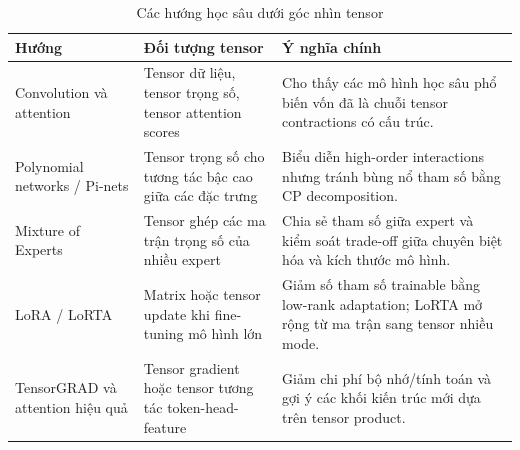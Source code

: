 \begin{table}[H]
\centering
\small
\caption{Các hướng học sâu dưới góc nhìn tensor}
\label{tab:dl-tensor-directions}
\begin{tabular}{L{0.23\textwidth}L{0.34\textwidth}L{0.34\textwidth}}
\toprule
\textbf{Hướng} & \textbf{Đối tượng tensor} & \textbf{Ý nghĩa chính} \\
\midrule
Convolution và attention &
Tensor dữ liệu, tensor trọng số, tensor attention scores &
Cho thấy các mô hình học sâu phổ biến vốn đã là chuỗi tensor contractions có cấu trúc. \\
	\addlinespace
Polynomial networks / Pi-nets &
Tensor trọng số cho tương tác bậc cao giữa các đặc trưng &
Biểu diễn high-order interactions nhưng tránh bùng nổ tham số bằng CP decomposition. \\
	\addlinespace
Mixture of Experts &
Tensor ghép các ma trận trọng số của nhiều expert &
Chia sẻ tham số giữa expert và kiểm soát trade-off giữa chuyên biệt hóa và kích thước mô hình. \\
	\addlinespace
LoRA / LoRTA &
Matrix hoặc tensor update khi fine-tuning mô hình lớn &
Giảm số tham số trainable bằng low-rank adaptation; LoRTA mở rộng từ ma trận sang tensor nhiều mode. \\
	\addlinespace
TensorGRAD và attention hiệu quả &
Tensor gradient hoặc tensor tương tác token-head-feature &
Giảm chi phí bộ nhớ/tính toán và gợi ý các khối kiến trúc mới dựa trên tensor product. \\
\bottomrule
\end{tabular}
\end{table}

